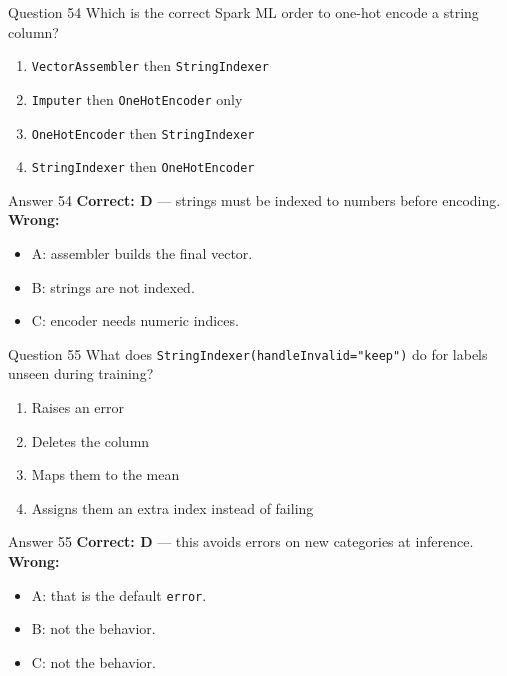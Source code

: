 \documentclass[aspectratio=169,11pt]{beamer}
\begin{document}
	\begin{frame}{Question 54}
		Which is the correct Spark ML order to one-hot encode a string column?
		\begin{enumerate}[label=\Alph*.]
			\item \texttt{VectorAssembler} then \texttt{StringIndexer}
			\item \texttt{Imputer} then \texttt{OneHotEncoder} only
			\item \texttt{OneHotEncoder} then \texttt{StringIndexer}
			\item \texttt{StringIndexer} then \texttt{OneHotEncoder}
		\end{enumerate}
	\end{frame}
	\begin{frame}{Answer 54}
		\textbf{Correct: D} --- strings must be indexed to numbers before encoding.\\
		\vspace{0.5em}
		\textbf{Wrong:}
		\begin{itemize}
			\item A: assembler builds the final vector.
			\item B: strings are not indexed.
			\item C: encoder needs numeric indices.
		\end{itemize}
	\end{frame}
	
	\begin{frame}{Question 55}
		What does \texttt{StringIndexer(handleInvalid="keep")} do for labels unseen during training?
		\begin{enumerate}[label=\Alph*.]
			\item Raises an error
			\item Deletes the column
			\item Maps them to the mean
			\item Assigns them an extra index instead of failing
		\end{enumerate}
	\end{frame}
	\begin{frame}{Answer 55}
		\textbf{Correct: D} --- this avoids errors on new categories at inference.\\
		\vspace{0.5em}
		\textbf{Wrong:}
		\begin{itemize}
			\item A: that is the default \texttt{error}.
			\item B: not the behavior.
			\item C: not the behavior.
		\end{itemize}
	\end{frame}
	
\end{document}
